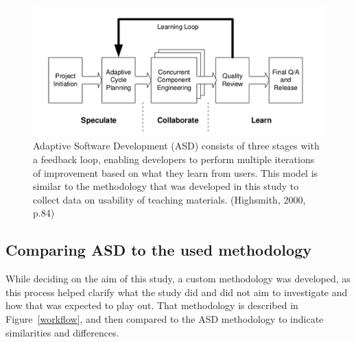 \begin{figure}
\hspace*{-1cm}
\includegraphics{figure/asd.png}
\centering
\caption{Adaptive Software Development (ASD) consists of three stages with a feedback loop, enabling developers to perform
multiple iterations of improvement based on what they learn from users. This model is similar to the methodology that was developed in this study to collect data on usability of teaching materials. (Highsmith, 2000, p.84)}
\label{asd}
\end{figure}


\subsection{Comparing ASD to the used methodology}
While deciding on the aim of this study, a custom methodology was developed, as this process helped clarify what the study did and did not aim to investigate and how that was expected to play out. That methodology is described in Figure~\ref{workflow}, and then compared to the ASD methodology to indicate similarities and differences.

